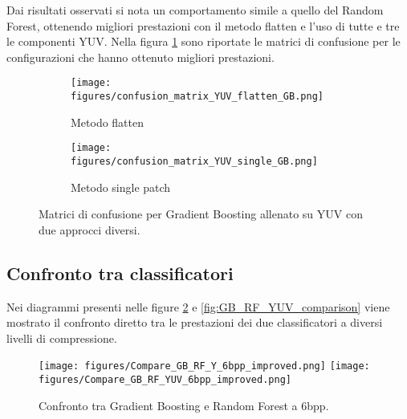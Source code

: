 Dai risultati osservati si nota un comportamento simile a quello del Random Forest, ottenendo migliori prestazioni con il metodo flatten e l'uso di tutte e tre le componenti YUV.
Nella figura \ref{fig:GB_YUV_confusion} sono riportate le matrici di confusione per le configurazioni che hanno ottenuto migliori prestazioni.
\begin{figure}[H]
    \centering
    \begin{subfigure}[b]{0.7\textwidth}
        \centering
        \texttt{[image: figures/confusion\_matrix\_YUV\_flatten\_GB.png]}
        \caption{Metodo flatten}
    \end{subfigure}
    \hfill
    \begin{subfigure}[b]{0.7\textwidth}
        \centering
        \texttt{[image: figures/confusion\_matrix\_YUV\_single\_GB.png]}
        \caption{Metodo single patch}
    \end{subfigure}
    \caption{Matrici di confusione per Gradient Boosting allenato su YUV con due approcci diversi.}
    \label{fig:GB_YUV_confusion}
\end{figure}
\subsection{Confronto tra classificatori}
Nei diagrammi presenti nelle figure \ref{fig:GB_RF_Y_comparison} e \ref{fig:GB_RF_YUV_comparison} viene mostrato il confronto diretto tra le prestazioni dei due classificatori a diversi livelli di compressione.
\begin{figure}[H]
    \centering
    \texttt{[image: figures/Compare\_GB\_RF\_Y\_6bpp\_improved.png]}
    \texttt{[image: figures/Compare\_GB\_RF\_YUV\_6bpp\_improved.png]}
    \caption{Confronto tra Gradient Boosting e Random Forest a 6bpp.}
    \label{fig:GB_RF_Y_comparison}
\end{figure}

